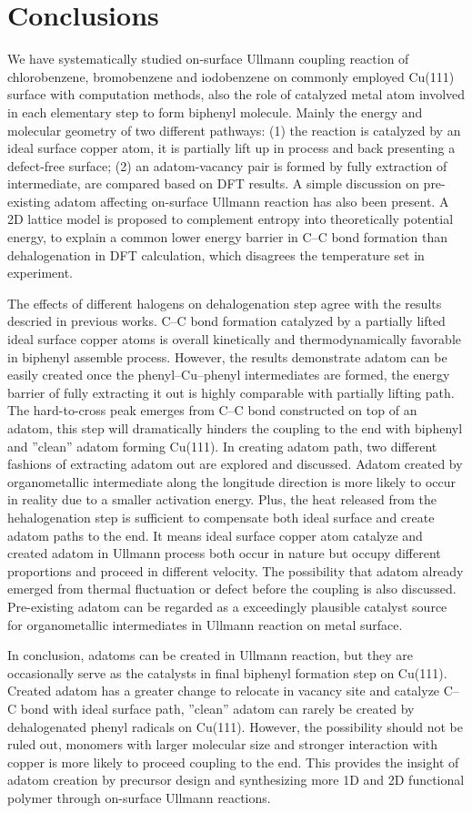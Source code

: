 \documentclass[%
 reprint,
 amsmath,amssymb,
 aps,
prb,
floatfix,
]{revtex4-2}
\begin{document}
\section{Conclusions}
{\color{blue}
We have systematically studied on-surface Ullmann coupling reaction of chlorobenzene, bromobenzene and iodobenzene on commonly employed Cu(111) surface with computation methods, also the role of catalyzed metal atom involved in each elementary step to form biphenyl molecule. Mainly the energy and molecular geometry of two different pathways: (1) the reaction is catalyzed by an ideal surface copper atom, it is partially lift up in process and back presenting a defect-free surface; (2) an adatom-vacancy pair is formed by fully extraction of intermediate, are compared based on DFT results. A simple discussion on pre-existing adatom affecting on-surface Ullmann reaction has also been present. A 2D lattice model is proposed to complement entropy into theoretically potential energy, to explain a common lower energy barrier in C--C bond formation than dehalogenation in DFT calculation, which disagrees the temperature set in experiment.

The effects of different halogens on dehalogenation step agree with the results descried in previous works. C--C bond formation catalyzed by a partially lifted ideal surface copper atoms is overall kinetically and thermodynamically favorable in biphenyl assemble process. However, the results demonstrate adatom can be easily created once the phenyl--Cu--phenyl intermediates are formed, the energy barrier of fully extracting it out is highly comparable with partially lifting path. The hard-to-cross peak emerges from C--C bond constructed on top of an adatom, this step will dramatically hinders the coupling to the end with biphenyl and ''clean'' adatom forming Cu(111). In creating adatom path, two different fashions of extracting adatom out are explored and discussed. Adatom created by organometallic intermediate along the longitude direction is more likely to occur in reality due to a smaller activation energy. Plus, the heat released from the hehalogenation step is sufficient to compensate both ideal surface and create adatom paths to the end. It means ideal surface copper atom catalyze and created adatom in Ullmann process both occur in nature but occupy different proportions and proceed in different velocity.
The possibility that adatom already emerged from thermal fluctuation or defect before the coupling is also discussed. Pre-existing adatom can be regarded as a exceedingly plausible catalyst source for organometallic intermediates in Ullmann reaction on metal surface.

In conclusion, adatoms can be created in Ullmann reaction, but they are occasionally serve as the catalysts in final biphenyl formation step on Cu(111). Created adatom has a greater change to relocate in vacancy site and catalyze C--C bond with ideal surface path, ''clean'' adatom can rarely be created by dehalogenated phenyl radicals on Cu(111). However, the possibility should not be ruled out, monomers with larger molecular size and stronger interaction with copper is more likely to proceed coupling to the end. This provides the insight of adatom creation by precursor design and synthesizing more 1D and 2D functional polymer through on-surface Ullmann reactions.
}
\end{document}
